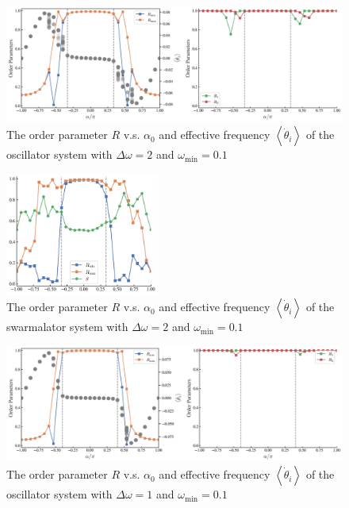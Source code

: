 \documentclass{article}
\begin{document}
\begin{figure}[H]
    \centering
    \includegraphics[width=1\textwidth]{figs/OrderParameter_R_l9.6_dO2.png}
    \caption{The order parameter $R$ v.s. $\alpha_0$ and effective frequency $\left<\dot{\theta}_i\right>$ of the oscillator system with $\Delta \omega=2$ and $\omega_{\min}=0.1$}
\end{figure}

\begin{figure}[H]
    \centering
    \includegraphics[width=0.45\textwidth]{figs/OrderParameter_R_l9.6_d1_dO2_rS10.png}
    \caption{The order parameter $R$ v.s. $\alpha_0$ and effective frequency $\left<\dot{\theta}_i\right>$ of the swarmalator system with $\Delta \omega=2$ and $\omega_{\min}=0.1$}
\end{figure}

\begin{figure}[H]
    \centering
    \includegraphics[width=1\textwidth]{figs/OrderParameter_R_l9.6_dO1.png}
    \caption{The order parameter $R$ v.s. $\alpha_0$ and effective frequency $\left<\dot{\theta}_i\right>$ of the oscillator system with $\Delta \omega=1$ and $\omega_{\min}=0.1$}
\end{figure}
\end{document}
